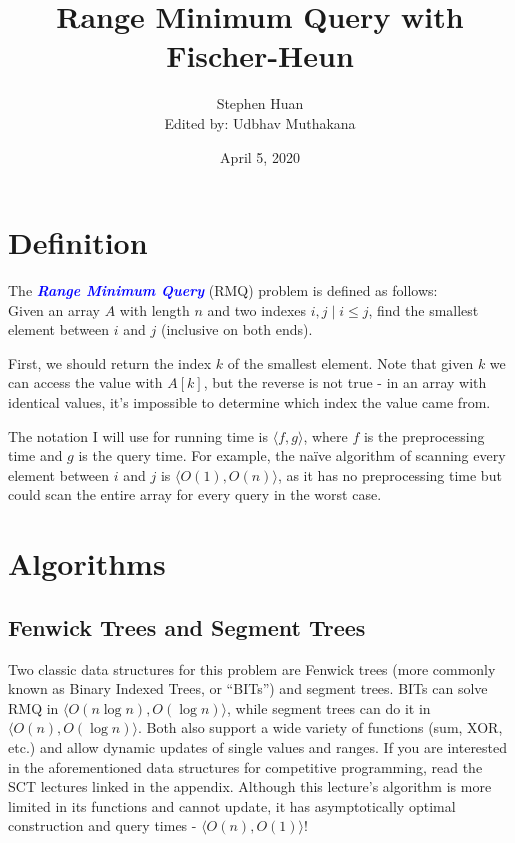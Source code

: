 \documentclass[11pt, oneside]{article}
\title{Range Minimum Query with Fischer-Heun}
\author{Stephen Huan\\ Edited by: Udbhav Muthakana}
\date{April 5, 2020}
\newcommand{\emphasis}[1]{\textcolor{blue}{\textbf{\textit{#1}}}}
\begin{document}
\maketitle

\section{Definition}

The \emphasis{Range Minimum Query} (RMQ) problem is defined as follows: \\
Given an array \( A \) with length \( n \) and two indexes \( i, j \mid i \leq j \),
find the smallest element between \( i \) and \( j \) (inclusive on both ends).

First, we should return the index \( k \) of the smallest element.
Note that given \( k \) we can access the value
with \( A[k] \), but the reverse is not true - in an array with identical values,
it's impossible to determine which index the value came from.

The notation I will use for running time is \( \langle f, g \rangle \),
where \( f \) is the preprocessing time and \( g \) is the query time. For example,
the naïve algorithm of scanning every element between \( i \) and \( j \)
is \( \langle O(1), O(n) \rangle \), as it has no preprocessing time
but could scan the entire array for every query in the worst case.

\section{Algorithms}
\subsection{Fenwick Trees and Segment Trees}

Two classic data structures for this problem are Fenwick trees (more commonly known as Binary Indexed Trees, or ``BITs'')
and segment trees. BITs can solve RMQ in \( \langle O(n \log n), O(\log n) \rangle \), while segment trees
can do it in \( \langle O(n), O(\log n) \rangle \). Both also support a wide variety of functions (sum, XOR, etc.) and
allow dynamic updates of single values and ranges. If you are interested in the aforementioned data structures for competitive programming,
read the SCT lectures linked in the appendix. Although this lecture's algorithm is more limited in its functions
and cannot update, it has asymptotically optimal construction and query times - \( \langle O(n), O(1) \rangle \)!
\end{document}
